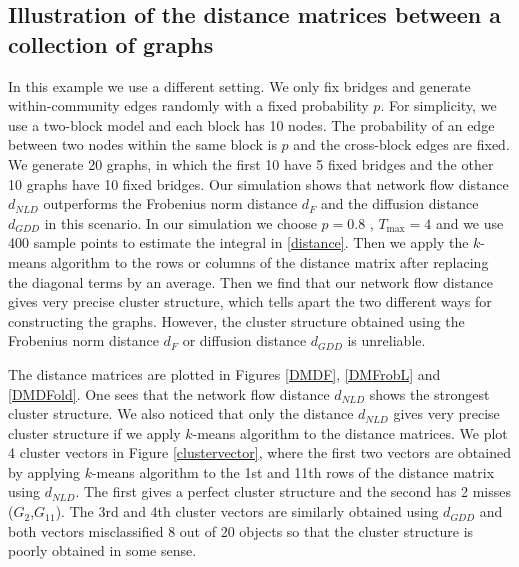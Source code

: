 \documentclass{amsart}
\begin{document}
	\subsection{Illustration of the distance matrices between a collection of graphs}\label{example2}
	In this example we use a different setting. We only fix bridges and generate within-community edges randomly with a fixed probability $p$. 
	For simplicity, we use a two-block model and each block has 10 nodes. The probability of an edge between two nodes within the same block is $p$ and the cross-block edges are fixed. We generate 20 graphs, in which the first 10 have 5 fixed bridges and the other 10 graphs have 10 fixed bridges. Our simulation shows that network flow distance $d_{NLD}$ outperforms the Frobenius norm distance $d_F$ and the diffusion distance $d_{GDD}$ in this scenario. In our simulation we choose $p=0.8$ , $T_{\max}=4$ and we use 400 sample points to estimate the integral in \eqref{distance}. Then we apply the $k$-means algorithm to the rows or columns of the distance matrix after replacing the diagonal terms by an average. Then we find that our network flow distance gives very precise cluster structure, which tells apart the two different ways for constructing the graphs. However, the cluster structure obtained using the Frobenius norm distance $d_F$ or diffusion distance $d_{GDD}$ is unreliable.
	
	
	The distance matrices are plotted in Figures \ref{DMDF}, \ref{DMFrobL} and \ref{DMDFold}.  One sees that the network flow  distance $d_{NLD}$ shows the strongest cluster structure. We also noticed that  only the distance ${d_{NLD}}$ gives very precise cluster structure if we apply $k$-means algorithm to the distance matrices. We plot 4 cluster vectors in Figure \ref{clustervector}, where the first two vectors are obtained by applying $k$-means algorithm to the 1st and 11th rows of the distance matrix using $d_{NLD}$. The first gives a perfect cluster structure and the second has 2 misses ($G_2$,$G_{11}$). The 3rd and 4th cluster vectors are similarly obtained using $d_{GDD}$ and both vectors misclassified 8 out of 20 objects so that the cluster structure is poorly obtained in some sense.
	
		
%
	
\end{document}
